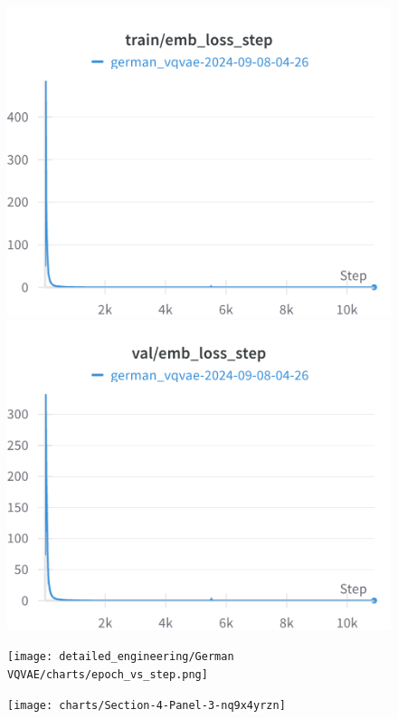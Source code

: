 \begin{figure}[H]
\includegraphics[width=\linewidth]{detailed_engineering/German VQVAE/charts/train_emb_loss_step.png}
\caption{}
\endminipage\hfill
{}
\includegraphics[width=\linewidth]{detailed_engineering/German VQVAE/charts/val_emb_loss_step.png}
\caption{}
\endminipage
\end{figure}

\begin{figure}[H]
\texttt{[image: detailed\_engineering/German VQVAE/charts/epoch\_vs\_step.png]}
\caption{}
\endminipage\hfill
{}
\texttt{[image: charts/Section-4-Panel-3-nq9x4yrzn]}
\caption{}
\endminipage
\end{figure}


